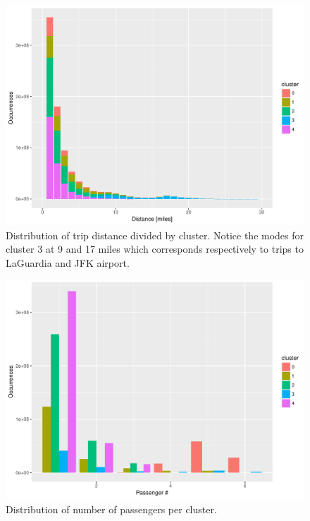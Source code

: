 \documentclass{acm_proc_article-sp-sigmod09}
\begin{document}
\begin{figure}
	\centering
	\includegraphics[width=1\columnwidth]{resources/clustered_plots/trip_distance_distr.pdf}
	\caption{Distribution of trip distance divided by cluster. Notice the modes for cluster 3 at 9 and 17 miles which corresponds respectively to trips to LaGuardia and JFK airport.}
	\label{fig:clusterDistance}
\end{figure}
\begin{figure}
	\centering
	\includegraphics[width=1\columnwidth]{resources/clustered_plots/passenger_count_distr.pdf}
	\caption{Distribution of number of passengers per cluster.}
	\label{fig:clusterPassengerDistr}
\end{figure}
\end{document}
